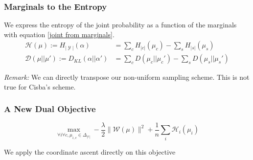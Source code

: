 \documentclass{beamer}
\DeclareMathOperator{\1}{\mathbb{1}}
\DeclareMathOperator{\Y}{\mathcal{Y}}
\begin{document}
\begin{frame}
	\frametitle{Marginals to the Entropy}
	
	We express the entropy of the joint probability as a function of the marginals with equation \ref{joint from marginals}.
	\begin{align*}
	\mathcal H (\mu) := H_{|\Y|} (\alpha) & = \sum_c H_{|c|}(\mu_c) - \sum_s H_{|s|}(\mu_s) \\
	\mathcal D (\mu||\mu') := D_{KL}(\alpha||\alpha') & = \sum_c D(\mu_c||\mu_c') - \sum_s D(\mu_s||\mu_s')
	\end{align*}
	
	\textit{Remark:} We can directly transpose our non-uniform sampling scheme.
	This is not true for Cisba's scheme.

\end{frame}
\begin{frame}
	\frametitle{A New Dual Objective}
	
	\begin{equation}
	\max_{\forall i \forall c, \mu_{i, c} \in \Delta_{|c|} } - \frac{\lambda}{2} \| \mathcal W(\mu)\|^2 + \frac{1}{n} \sum_i \mathcal H _ i(\mu_i)
	\end{equation}
	
	\begin{center}
		We apply the coordinate ascent directly on this objective
	\end{center}

\end{frame}
\end{document}
